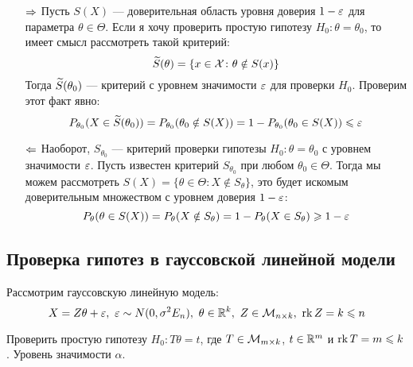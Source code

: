 \begin{itemize}
	\item[$\Rightarrow$] Пусть $S(X)$ --- доверительная область уровня доверия $1 - \varepsilon$ для параметра $\theta \in \Theta$. Если я хочу проверить простую гипотезу $H_0 \colon \theta = \theta_0$, то имеет смысл рассмотреть такой критерий:
	\[
		\widetilde{S}(\theta) = \{x \in \mathcal{X} \colon \theta \notin S(x)\}
	\]
	Тогда $\widetilde{S}(\theta_0)$ --- критерий с уровнем значимости $\varepsilon$ для проверки $H_0$. Проверим этот факт явно:
	\[
		P_{\theta_0}(X \in \widetilde{S}(\theta_0)) = P_{\theta_0}(\theta_0 \notin S(X)) = 1 - P_{\theta_0}(\theta_0 \in S(X)) \leqslant \varepsilon
	\]
	
	\item[$\Leftarrow$] Наоборот, $S_{\theta_0}$ --- критерий проверки гипотезы $H_0 \colon \theta = \theta_0$ с уровнем значимости $\varepsilon$. Пусть известен критерий $S_{\theta_0}$ при любом $\theta_0 \in \Theta$. Тогда мы можем рассмотреть $S(X) = \{\theta \in \Theta \colon X \notin S_\theta\}$, это будет искомым доверительным множеством с уровнем доверия $1 - \varepsilon$:
	\[
		P_\theta(\theta \in S(X)) = P_\theta(X \notin S_\theta) = 1 - P_\theta(X \in S_\theta) \geqslant 1 - \varepsilon
	\]
\end{itemize}

\subsection{Проверка гипотез в гауссовской линейной модели}

\begin{note}
	Рассмотрим гауссовскую линейную модель:
	\[
		X = Z\theta + \varepsilon,\ \varepsilon \sim N(0, \sigma^2E_n),\ \theta \in \mathbb{R}^k,\ Z \in \mathcal{M}_{n \times k},\ \operatorname{rk} Z = k \leqslant n
	\]
\end{note}

\begin{problem}
	Проверить простую гипотезу $H_0 \colon T \theta = t$, где $T \in \mathcal{M}_{m \times k}$, $t \in \mathbb{R}^m$ и $\operatorname{rk} T = m \leqslant k$. Уровень значимости $\alpha$.
\end{problem}

